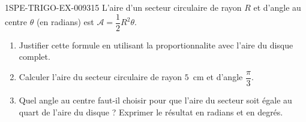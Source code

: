 \begin{exercice}{1SPE-TRIGO-EX-009}{3}{15}
L'aire d'un secteur circulaire de rayon $R$ et d'angle au centre $\theta$ (en radians) est $\mathcal{A} = \dfrac{1}{2}R^2\theta$.
\begin{enumerate}
  \item Justifier cette formule en utilisant la proportionnalite avec l'aire du disque complet.
  \item Calculer l'aire du secteur circulaire de rayon $5$~cm et d'angle $\dfrac{\pi}{3}$.
  \item Quel angle au centre faut-il choisir pour que l'aire du secteur soit égale au quart de l'aire du disque ? Exprimer le résultat en radians et en degrés.
\end{enumerate}
\end{exercice}
